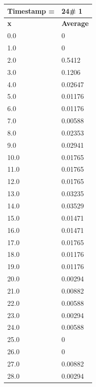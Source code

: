 \begin{tabular}{|l||l|}
\hline
\textbf{Timestamp =} & \textbf{24}\# 1\\\hline
	\textbf{x} & \textbf{Average} \\ \hline
\hline
	0.0 & 0 \\ \hline
	1.0 & 0 \\ \hline
	2.0 & 0.5412 \\ \hline
	3.0 & 0.1206 \\ \hline
	4.0 & 0.02647 \\ \hline
	5.0 & 0.01176 \\ \hline
	6.0 & 0.01176 \\ \hline
	7.0 & 0.00588 \\ \hline
	8.0 & 0.02353 \\ \hline
	9.0 & 0.02941 \\ \hline
	10.0 & 0.01765 \\ \hline
	11.0 & 0.01765 \\ \hline
	12.0 & 0.01765 \\ \hline
	13.0 & 0.03235 \\ \hline
	14.0 & 0.03529 \\ \hline
	15.0 & 0.01471 \\ \hline
	16.0 & 0.01471 \\ \hline
	17.0 & 0.01765 \\ \hline
	18.0 & 0.01176 \\ \hline
	19.0 & 0.01176 \\ \hline
	20.0 & 0.00294 \\ \hline
	21.0 & 0.00882 \\ \hline
	22.0 & 0.00588 \\ \hline
	23.0 & 0.00294 \\ \hline
	24.0 & 0.00588 \\ \hline
	25.0 & 0 \\ \hline
	26.0 & 0 \\ \hline
	27.0 & 0.00882 \\ \hline
	28.0 & 0.00294 \\ \hline
\end{tabular}
